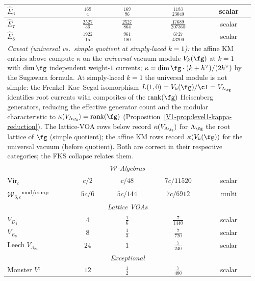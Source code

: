 \begin{table}[ht]
{\begin{tabular}{|l|c|c|c|c|}
\hline
$\widehat{E}_6$ & $\tfrac{169}{4}$ & $\tfrac{169}{96}$ & $\tfrac{1183}{23040}$ & scalar \\
\hline
$\widehat{E}_7$ & $\tfrac{2527}{36}$ & $\tfrac{2527}{864}$ & $\tfrac{17689}{207360}$ & scalar \\
\hline
$\widehat{E}_8$ & $\tfrac{1922}{15}$ & $\tfrac{961}{180}$ & $\tfrac{6727}{43200}$ & scalar \\
\hline
\multicolumn{5}{|p{0.96\textwidth}|}{%
\footnotesize\textit{Caveat (universal vs.\ simple quotient at simply-laced $k=1$):} the affine
KM entries above compute $\kappa$ on the \emph{universal} vacuum module $V_k(\fg)$ at $k=1$
with $\dim\fg$ independent weight-$1$ currents; $\kappa = \dim\fg \cdot (k+h^\vee)/(2h^\vee)$
by the Sugawara formula. At simply-laced $k=1$ the universal module is not simple: the Frenkel--Kac--Segal
isomorphism $L(1,0) = V_k(\fg)/\cI = V_{\Lambda_\fg}$ identifies root currents with composites
of the $\operatorname{rank}(\fg)$ Heisenberg generators, reducing the effective generator count
and the modular characteristic to $\kappa(V_{\Lambda_\fg}) = \operatorname{rank}(\fg)$
(Proposition~\ref{V1-prop:level1-kappa-reduction}). The lattice-VOA rows below record
$\kappa(V_{\Lambda_\fg})$ for $\Lambda_\fg$ the root lattice of $\fg$ (simple quotient); the
affine KM rows record $\kappa(V_k(\fg))$ for the universal vacuum (before quotient). Both are
correct in their respective categories; the FKS collapse relates them.
}\\
\hline
\multicolumn{5}{|c|}{\textit{$\mathcal{W}$-Algebras}} \\
\hline
$\mathrm{Vir}_{c}$ & $c/2$ & $c/48$ & $7c/11520$ & scalar \\
\hline
$\mathcal{W}_{3,c}$\textsuperscript{$\mathrm{mod/comp}$}
 & $5c/6$ & $5c/144$ & $7c/6912$ & multi \\
\hline
\multicolumn{5}{|c|}{\textit{Lattice VOAs}} \\
\hline
$V_{D_4}$ & $4$ & $\tfrac{1}{6}$ & $\tfrac{7}{1440}$ & scalar \\
\hline
$V_{E_8}$ & $8$ & $\tfrac{1}{3}$ & $\tfrac{7}{720}$ & scalar \\
\hline
Leech $V_{\Lambda_{24}}$ & $24$ & $1$ & $\tfrac{7}{240}$ & scalar \\
\hline
\multicolumn{5}{|c|}{\textit{Exceptional}} \\
\hline
Monster $V^\natural$ & $12$ & $\tfrac{1}{2}$ & $\tfrac{7}{480}$ & scalar \\
\hline
\end{tabular}
}%
\end{table}

